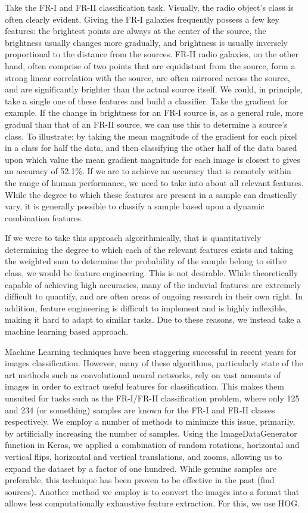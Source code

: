 \documentclass[%
 aip,
 jmp,%
 amsmath,amssymb,
 reprint,%
]{revtex4-1}
\begin{document}
Take the FR-I and FR-II classification task. Visually, the radio object's class is often clearly evident. Giving the FR-I galaxies frequently possess a few key features: the brightest points are always at the center of the source, the brightness usually changes more gradually, and brightness is usually inversely proportional to the distance from the sources.  FR-II radio galaxies, on the other hand, often comprise of two points that are equidistant from the source, form a strong linear correlation with the source, are often mirrored across the source, and are significantly brighter than the actual source itself. We could, in principle, take a single one of these features and build a classifier. Take the gradient for example. If the change in brightness for an FR-I source is, as a general rule, more gradual than that of an FR-II source, we can use this to determine a source's class. To illustrate: by taking the mean magnitude of the gradient for each pixel in a class for half the data, and then classifying the other half of the data based upon which value the mean gradient magnitude for each image is closest to gives an accuracy of 52.1\%. If we are to achieve an accuracy that is remotely within the range of human performance, we need to take into about all relevant features. While the degree to which these features are present in a sample can drastically vary, it is generally possible to classify a sample based upon a dynamic combination features. 

If we were to take this approach algorithmically, that is quantitatively determining the degree to which each of the relevant features exists and taking the weighted sum to determine the probability of the sample belong to either class, we would be feature engineering. This is not desirable. While theoretically capable of achieving high accuracies, many of the induvial features are extremely difficult to quantify, and are often areas of ongoing research in their own right. In addition, feature engineering is difficult to implement and is highly inflexible, making it hard to adapt to similar tasks. Due to these reasons, we instead take a machine learning based approach. 

Machine Learning techniques have been staggering successful in recent years for images classification. However, many of these algorithms, particularly state of the art methods such as convolutional neural networks, rely on vast amounts of images in order to extract useful features for classification. This makes them unsuited for tasks such as the FR-I/FR-II classification problem, where only 125 and 234 (or something) samples are known for the FR-I and FR-II classes respectively. We employ a number of methods to minimize this issue, primarily, by artificially increasing the number of samples. Using the ImageDataGenerator function in Keras, we applied a combination of random rotations, horizontal and vertical flips, horizontal and vertical translations, and zooms, allowing us to expand the dataset by a factor of one hundred. While genuine samples are preferable, this technique has been proven to be effective in the past (find sources).  Another method we employ is to convert the images into a format that allows less computationally exhaustive feature extraction. For this, we use HOG. 
\end{document}
